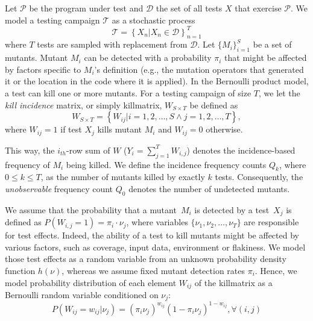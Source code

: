 \documentclass[sigconf]{acmart}
\begin{document}
Let $\mathcal{P}$ be the program under test and $\mathcal{D}$ the set of all tests $X$ that exercise $\mathcal{P}$.
We model a testing campaign $\mathcal{T}$ 
as a stochastic process
\[
    \mathcal{T}=\left\{ X_n|X_n \in \mathcal{D} \right\}_{n=1}^T
\]
where $T$ tests are sampled with replacement from $\mathcal{D}$.
Let $\{M_i\}_{i=1}^S$ be a set of mutants.
Mutant ${M_i}$ can be detected with a probability $\pi_i$ that
might be affected by factors specific to ${M_i}$'s definition (e.g.,
the mutation operators that generated it or the location in the code where it is applied).
In the Bernoulli product model, a test can kill one or more mutants.
For a testing campaign of size $T$, %
we let the \emph{kill incidence} matrix, or simply killmatrix, $W_{S\times T}$ be defined as
\[
    W_{S\times T} = \left\{W_{ij} |i=1,2,\dots,S\land j=1,2,\dots,T \right\},
\]
where $W_{ij} = 1$ if test $X_j$ kills mutant $M_i$ and $W_{ij} = 0$ otherwise.

This way, the $i_{th}$-row sum of $W$ ($Y_i=\sum_{j=1}^{T}W_{i,j}$) denotes the
incidence-based frequency of $M_i$ being killed.
We define the incidence frequency counts $Q_k$, where $0 \leq k \leq T$, as the number of mutants killed by exactly $k$ tests.
Consequently, the \emph{unobservable} frequency count $Q_0$
denotes the number of undetected mutants.

We assume that the probability that a mutant~$M_i$ is detected by a test~$X_j$ is defined as
$P(W_{i,j}=1) = \pi_{i} \cdot \nu_{j}$,
where variables $\{\nu_{1}, \nu_{2},\dots,\nu_{T}\}$ are responsible for test effects.
Indeed, the ability of a test to kill mutants might be affected by various factors, such as
coverage,
input data, environment or flakiness.
We model those test effects as a random
variable from an unknown probability density function $h(\nu)$, whereas
we assume fixed mutant detection rates $\pi_i$.
Hence, we model probability distribution of each element $W_{ij}$ of the killmatrix as a Bernoulli random variable conditioned on $\nu_j$:
\small
\begin{displaymath}
    P(W_{ij}=w_{ij}|\nu_j)=(\pi_i \nu_j)^{w_{ij}}(1-\pi_i \nu_j)^{1-w_{ij}}, \forall (i,j)
\end{displaymath}
\normalsize
\end{document}
